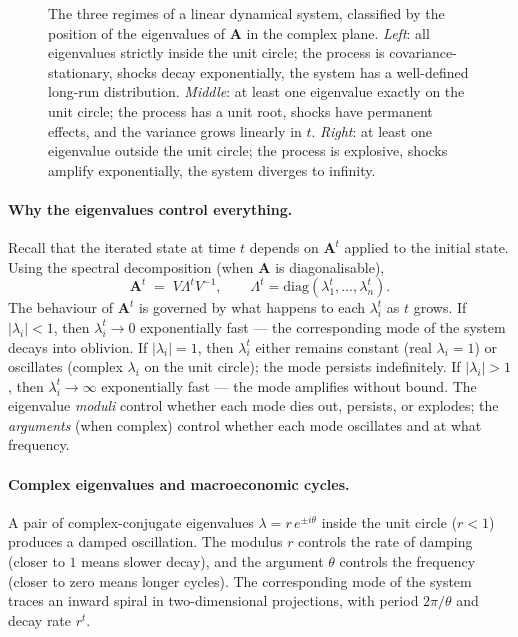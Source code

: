 \documentclass[11pt, a4paper, oneside]{article}
\begin{document}
\begin{figure}[H]
\caption{The three regimes of a linear dynamical system, classified
by the position of the eigenvalues of $\mathbf{A}$ in the complex
plane. \emph{Left}: all eigenvalues strictly inside the unit
circle; the process is covariance-stationary, shocks decay
exponentially, the system has a well-defined long-run distribution.
\emph{Middle}: at least one eigenvalue exactly on the unit circle;
the process has a unit root, shocks have permanent effects, and the
variance grows linearly in $t$. \emph{Right}: at least one
eigenvalue outside the unit circle; the process is explosive, shocks
amplify exponentially, the system diverges to infinity.}
\label{fig:unit-circle-stability}
\end{figure}

\paragraph{Why the eigenvalues control everything.}
Recall that the iterated
state at time $t$ depends on $\mathbf{A}^t$ applied to the initial
state. Using the spectral decomposition (when $\mathbf{A}$ is
diagonalisable),
\[
\mathbf{A}^t \;=\; V \Lambda^t V^{-1}, \qquad \Lambda^t = \mathrm{diag}(\lambda_1^t, \ldots, \lambda_n^t).
\]
The behaviour of $\mathbf{A}^t$ is governed by what happens to each
$\lambda_i^t$ as $t$ grows. If $|\lambda_i| < 1$, then $\lambda_i^t \to 0$
exponentially fast — the corresponding mode of the system decays
into oblivion. If $|\lambda_i| = 1$, then $\lambda_i^t$ either
remains constant (real $\lambda_i = 1$) or oscillates (complex
$\lambda_i$ on the unit circle); the mode persists indefinitely. If
$|\lambda_i| > 1$, then $\lambda_i^t \to \infty$ exponentially fast
— the mode amplifies without bound. The eigenvalue \emph{moduli}
control whether each mode dies out, persists, or explodes; the
\emph{arguments} (when complex) control whether each mode oscillates
and at what frequency.

\paragraph{Complex eigenvalues and macroeconomic cycles.}
A pair of complex-conjugate eigenvalues $\lambda = r\, e^{\pm i \theta}$
inside the unit circle ($r < 1$) produces a damped oscillation. The
modulus $r$ controls the rate of damping (closer to $1$ means slower
decay), and the argument $\theta$ controls the frequency (closer to
zero means longer cycles). The corresponding mode of the system
traces an inward spiral in two-dimensional projections, with period
$2\pi/\theta$ and decay rate $r^t$.
\end{document}
